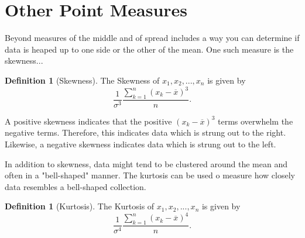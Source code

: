 \documentclass[10pt,]{book}
\theoremstyle{plain}
\theoremstyle{definition}
\newtheorem{definition}[theorem]{Definition}
\theoremstyle{definition}
\theoremstyle{definition}
\numberwithin{equation}{section}
\begin{document}
\section[Other Point Measures]{Other Point Measures}\label{section-10}
Beyond measures of the middle and of spread includes a way you can determine if data is heaped up to one side or the other of the mean. One such measure is the skewness...
%
\begin{definition}[Skewness]\label{definition-15}
The Skewness of \(x_1, x_2, ..., x_n\) is given by
\begin{equation*} \frac{1}{\sigma^3} \frac{\sum_{k=1}^n ( x_k-\overline{x} )^3}{n}.\end{equation*}
%
\end{definition}
\par

A positive skewness indicates that the positive \((x_k - \overline{x})^3\) terms overwhelm the negative terms. Therefore, this indicates data which is strung out to the right. Likewise, a negative skewness indicates data which is strung out to the left.
%
\par

In addition to skewness, data might tend to be clustered around the mean and often in a "bell-shaped" manner. The kurtosis can be used o measure how closely data resembles a bell-shaped collection.
%
\begin{definition}[Kurtosis]\label{definition-16}
The Kurtosis of \(x_1, x_2, ..., x_n\) is given by
\begin{equation*} \frac{1}{\sigma^4} \frac{\sum_{k=1}^n ( x_k-\overline{x} )^4}{n}.\end{equation*}
%
\end{definition}
\par
\end{document}

